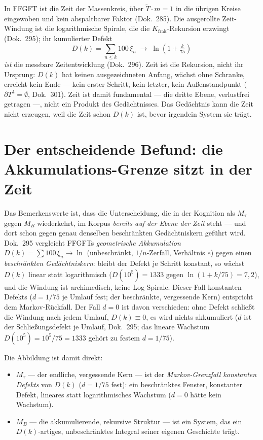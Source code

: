 In FFGFT ist die Zeit der Massenkreis, über $\tilde{T}\cdot m = 1$ in die übrigen Kreise
eingewoben und kein abspaltbarer Faktor (Dok.~285). Die ausgerollte Zeit-Windung ist die
logarithmische Spirale, die die $K_{\text{frak}}$-Rekursion erzwingt (Dok.~295); ihr
kumulierter Defekt
\begin{equation}
D(k) = \sum_{n\le k} 100\,\xi_n \;\to\; \ln\!\left(1 + \tfrac{k}{75}\right)
\end{equation}
\emph{ist} die messbare Zeitentwicklung (Dok.~296). Zeit ist die Rekursion, nicht ihr
Ursprung: $D(k)$ hat keinen ausgezeichneten Anfang, wächst ohne Schranke, erreicht kein
Ende --- kein erster Schritt, kein letzter, kein Außenstandpunkt ($\partial T^4 = \emptyset$,
Dok.~301). Zeit ist damit fundamental --- die dritte Ebene, verlustfrei getragen ---, nicht
ein Produkt des Gedächtnisses. Das Gedächtnis kann die Zeit nicht erzeugen, weil die Zeit
schon $D(k)$ ist, bevor irgendein System sie trägt.

\section{Der entscheidende Befund: die Akkumulations-Grenze sitzt in der Zeit}

Das Bemerkenswerte ist, dass die Unterscheidung, die in der Kognition als $M_\tau$ gegen
$M_B$ wiederkehrt, im Korpus \emph{bereits auf der Ebene der Zeit} steht --- und dort schon
gegen genau denselben beschränkten Gedächtniskern geführt wird. Dok.~295 vergleicht
FFGFTs \emph{geometrische Akkumulation} $D(k)=\sum 100\,\xi_n\to\ln$ (unbeschränkt,
$1/n$-Zerfall, Verhältnis $e$) gegen einen \emph{beschränkten Gedächtniskern}: bleibt der
Defekt je Schritt konstant, so wächst $D(k)$ linear statt logarithmisch
($D(10^5)=1333$ gegen $\ln(1+k/75)=7{,}2$), und die Windung ist archimedisch, keine
Log-Spirale. Dieser Fall konstanten Defekts ($d = 1/75$ je Umlauf fest; der beschränkte,
vergessende Kern) entspricht dem Markov-Rückfall. Der Fall $d=0$ ist davon verschieden:
ohne Defekt schließt die Windung nach jedem Umlauf, $D(k)\equiv 0$, es wird nichts
akkumuliert ($d$ ist der Schließungsdefekt je Umlauf, Dok.~295; das lineare
Wachstum $D(10^5) = 10^5/75 = 1333$ gehört zu festem $d = 1/75$).

Die Abbildung ist damit direkt:
\begin{itemize}
\item $M_\tau$ --- der endliche, vergessende Kern --- ist der \emph{Markov-Grenzfall
konstanten Defekts} von $D(k)$ ($d = 1/75$ fest): ein beschränktes Fenster, konstanter
Defekt, lineares statt logarithmisches Wachstum ($d = 0$ hätte kein Wachstum).
\item $M_B$ --- die akkumulierende, rekursive Struktur --- ist ein System, das ein
$D(k)$-artiges, unbeschränktes Integral seiner eigenen Geschichte trägt.
\end{itemize}


